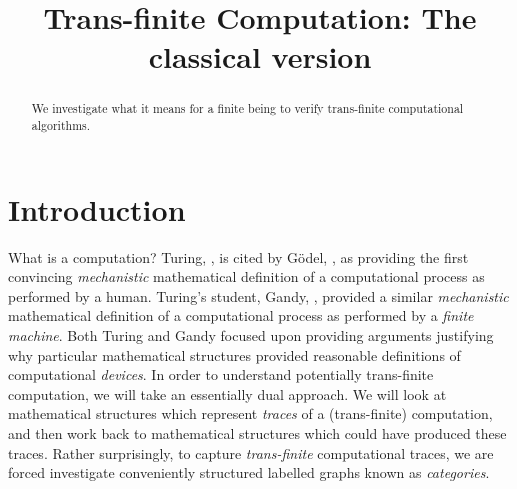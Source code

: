 \documentclass[a4paper]{amsart}
\begin{document}
\sloppy

\title[Computation: Classical version]{Trans-finite Computation: The classical version}

%

\begin{abstract}
We investigate what it means for a finite being to verify trans-finite computational
algorithms.
\end{abstract} 
\maketitle 
\tableofcontents 


\section{Introduction}

What is a computation? Turing, \cite{turing1936computableNumbersMachines}, is cited by
G\"odel, \cite{godel}, as providing the first convincing \emph{mechanistic} mathematical
definition of a computational process as performed by a human. Turing's student, Gandy,
\cite{gandy1980churchsThesisMechanisms}, provided a similar \emph{mechanistic}
mathematical definition of a computational process as performed by a \emph{finite
machine}. Both Turing and Gandy focused upon providing arguments justifying why particular
mathematical structures provided reasonable definitions of computational \emph{devices}.
In order to understand potentially trans-finite computation, we will take an essentially
dual approach. We will look at mathematical structures which represent \emph{traces} of a
(trans-finite) computation, and then work back to mathematical structures which could have
produced these traces. Rather surprisingly, to capture \emph{trans-finite} computational
traces, we are forced investigate conveniently structured labelled graphs known as
\emph{categories}.
\end{document}

